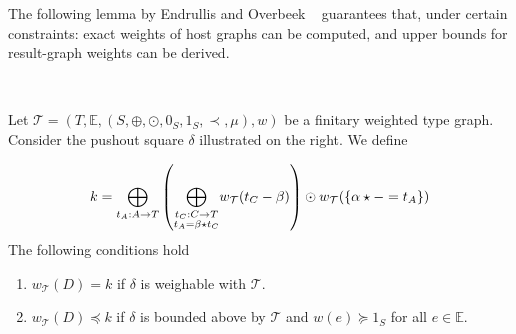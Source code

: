 The following lemma by Endrullis and Overbeek ~\cite{endrullis2024generalized_arxiv_v2} guarantees that, under certain constraints: exact weights of host graphs can be computed, and upper bounds for result-graph weights can be derived. 
\begin{lemma}
    \label{nwf:lem_4d13}
\ \newline
\begin{minipage}{0.7\textwidth}
    Let $\mathcal{T} = (T,\mathbb{E}, (S, \oplus, \odot, 0_S, 1_S, \prec, \mu), w)$ be a finitary weighted type graph. Consider the pushout square $\delta$ illustrated on the right. We define
\end{minipage}
\begin{minipage}{0.3\textwidth}
    \begin{center}{\normalfont
    }\end{center}
\end{minipage}
     \[k = \underset{t_A:A \rightarrow T}{\bigoplus}
            \left ( 
                \underset{\substack{t_C:C \rightarrow T\\
                                            t_A = \beta \star t_C }}{\bigoplus}
                        w_\mathcal{T}(t_C - \beta)     
                 \right ) 
            \odot 
                w_\mathcal{T}(\{\alpha \star - = t_A\})
    \]
    The following conditions hold
    \begin{enumerate}[label=(\Alph*)]
        \item  $w_\mathcal{T}(D)=k$ if $\delta$ is weighable with $\mathcal{T}$.
        \item  $w_\mathcal{T}(D)\preceq k$ if $\delta$ is bounded above by $\mathcal{T}$  and \(w(e) \succeq 1_S\) for all $e \in \mathbb{E}$.
    \end{enumerate}
\end{lemma}

